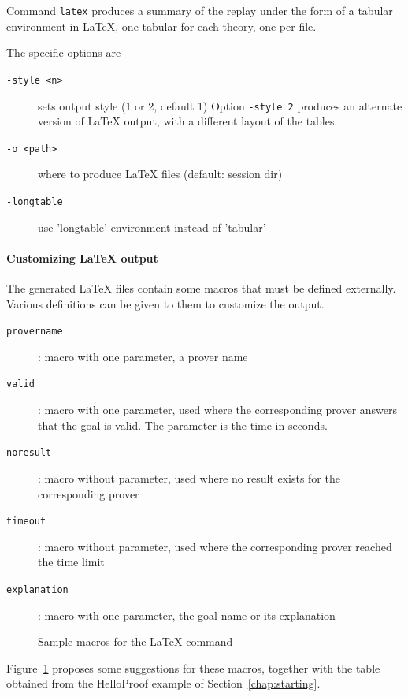 Command \texttt{latex} produces a summary of the replay under the form
of a tabular environment in LaTeX, one tabular for each theory, one
per file.

The specific options are
\begin{description}
\item[\texttt{-style <n>}] sets output style (1 or 2, default 1)
  Option \texttt{-style 2} produces an alternate version of LaTeX
  output, with a different layout of the tables.
\item[\texttt{-o <path>}] where
  to produce LaTeX files (default: session dir) 
\item[\texttt{-longtable}] use 'longtable' environment instead of 'tabular'
\end{description}


\paragraph{Customizing LaTeX output}

The generated LaTeX files contain some macros that must be defined
externally.  Various definitions can be given to them to customize the
output.
\begin{description}
\item[\texttt{\bs{}provername}]: macro with one parameter, a prover name
\item[\texttt{\bs{}valid}]: macro with one parameter, used where the corresponding prover answers that the goal is valid. The parameter is the time in seconds.
\item[\texttt{\bs{}noresult}]: macro without parameter, used where no result
  exists for the corresponding prover
\item[\texttt{\bs{}timeout}]: macro without parameter, used where the corresponding prover reached the time limit
\item[\texttt{\bs{}explanation}]: macro with one parameter, the goal name or its explanation
\end{description}

\begin{figure}[t]
  \begin{center}
    
  \end{center}
  
  \caption{Sample macros for the LaTeX command}
\label{fig:latex}
\end{figure}

Figure~\ref{fig:latex} proposes some suggestions for these macros,
together with the table obtained from the HelloProof example of
Section~\ref{chap:starting}.

